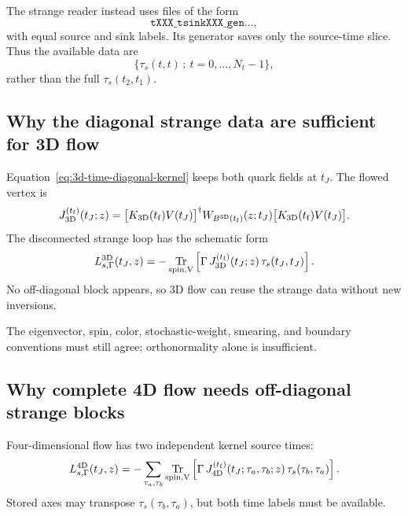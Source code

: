 \documentclass[11pt]{article}
\numberwithin{equation}{section}
\newcommand{\tf}{t_{\mathrm f}}
\DeclareMathOperator{\Tr}{Tr}
\begin{document}
The strange reader instead uses files of the form
\begin{equation}
  \texttt{tXXX\_tsinkXXX\_gen\ldots},
\end{equation}
with equal source and sink labels. Its generator saves only the source-time
slice. Thus the available data are
\begin{equation}
  \bigl\{\tau_s(t,t)\,;\ t=0,\ldots,N_t-1\bigr\},
  \label{eq:strange-diagonal-data}
\end{equation}
rather than the full \(\tau_s(t_2,t_1)\).

\subsection{Why the diagonal strange data are sufficient for 3D flow}

Equation~\eqref{eq:3d-time-diagonal-kernel} keeps both quark fields at
\(t_J\). The flowed vertex is
\begin{equation}
  J_{\rm 3D}^{(\tf)}(t_J;z)
  =
  \bigl[K_{\rm 3D}(\tf)V(t_J)\bigr]^\dagger
  W_{B^{\rm 3D}(\tf)}(z;t_J)
  \bigl[K_{\rm 3D}(\tf)V(t_J)\bigr].
  \label{eq:3d-vertex}
\end{equation}
The disconnected strange loop has the schematic form
\begin{equation}
  L_{s,\Gamma}^{\rm 3D}(t_J,z)
  =
  -\Tr_{\rm spin,V}
  \left[
    \Gamma\,
    J_{\rm 3D}^{(\tf)}(t_J;z)\,
    \tau_s(t_J,t_J)
  \right].
  \label{eq:3d-strange-loop}
\end{equation}
No off-diagonal block appears, so 3D flow can reuse the strange data without
new inversions.

The eigenvector, spin, color, stochastic-weight, smearing, and boundary
conventions must still agree; orthonormality alone is insufficient.

\subsection{Why complete 4D flow needs off-diagonal strange blocks}

Four-dimensional flow has two independent kernel source times:
\begin{equation}
  L_{s,\Gamma}^{\rm 4D}(t_J,z)
  =
  -\sum_{\tau_a,\tau_b}
  \Tr_{\rm spin,V}
  \left[
    \Gamma\,
    J_{\rm 4D}^{(\tf)}
      (t_J;\tau_a,\tau_b;z)\,
    \tau_s(\tau_b,\tau_a)
  \right].
  \label{eq:4d-strange-loop}
\end{equation}
Stored axes may transpose \(\tau_s(\tau_b,\tau_a)\), but both time labels must
be available.
\end{document}
